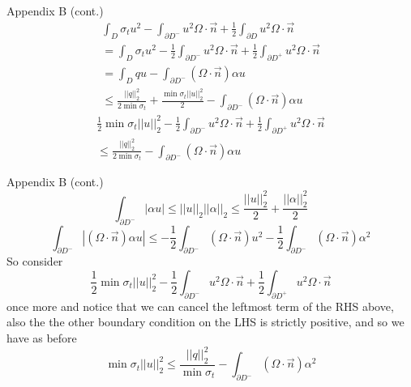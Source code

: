 \documentclass{beamer}
\theoremstyle{plain}
\theoremstyle{definition}
\begin{document}
\begin{frame}{Appendix B (cont.)}
\begin{align*}
 \int_D \sigma_t u^2 - \int_{\partial D^-} u^2 \Omega \cdot \vec n + \frac{1}{2} \int_{\partial D} u^2 \Omega \cdot \vec n \\
 = \int_D \sigma_tu^2 - \frac{1}{2}\int_{\partial D^-} u^2 \Omega \cdot \vec n + \frac{1}{2}\int_{\partial D^+} u^2 \Omega \cdot \vec n \\
 =  \int_D qu -  \int_{\partial D^-} (\Omega \cdot \vec n )\alpha u \\
 \leq \frac{||q||_2^2}{2\min \sigma_t} + \frac{\min \sigma_t||u||_2^2}{2} - \int_{\partial D^-} (\Omega \cdot \vec n) \alpha u
\end{align*}
\begin{align*}
    \frac{1}{2}\min \sigma_t ||u||_2^2 - \frac{1}{2} \int_{\partial D^{-}}  u^2\Omega \cdot \vec n + \frac{1}{2}\int_{\partial D^+} u^2\Omega \cdot \vec n \\
    \leq \frac{||q||^2_2}{2 \min \sigma_t}   - \int_{\partial D^-} (\Omega \cdot \vec n) \alpha u
\end{align*}


\end{frame}

\begin{frame}{Appendix B (cont.)}
\[\int_{\partial D^-} |\alpha u| \leq ||u||_2||\alpha||_2 \leq \frac{||u||_2^2}{2} + \frac{||\alpha||_2^2}{2}\]\[ \int_{\partial D^-}  |(\Omega \cdot \vec n)\alpha u| \leq -\frac{1}{2}\int_{\partial D^-} (\Omega \cdot \vec n)u^2 -\frac{1}{2} \int_{\partial D^-} (\Omega \cdot \vec n) \alpha ^2 \]
So consider \[
\frac{1}{2}\min \sigma_t ||u||_2^2 - \frac{1}{2} \int_{\partial D^{-}}  u^2\Omega \cdot \vec n + \frac{1}{2}\int_{\partial D^+} u^2\Omega \cdot \vec n
\]
once more and notice that we can cancel the leftmost term of the RHS above, also the the other boundary condition on the LHS is strictly positive, and so we have as before \[
 \min  \sigma_t ||u||_2^2 \leq \frac{||q||_2^2}{ \min \sigma_t} - \int_{\partial D^-} (\Omega \cdot \vec n)\alpha^2 
\]
\end{frame}
\end{document}
